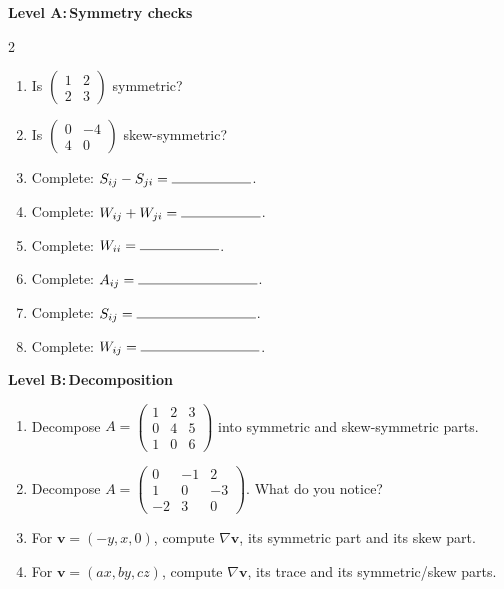\documentclass{otscience}
\begin{document}
\begin{practicebox}
    \textbf{Level A:\,Symmetry checks}
    \begin{multicols}{2}
        \begin{enumerate}
            \item Is \(\begin{pmatrix}1&2\\2&3\end{pmatrix}\) symmetric?
            \item Is \(\begin{pmatrix}0&-4\\4&0\end{pmatrix}\) skew-symmetric?
            \item Complete: \(S_{ij}-S_{ji}=\blank[2cm]\).
            \item Complete: \(W_{ij}+W_{ji}=\blank[2cm]\).
            \item Complete: \(W_{ii}=\blank[2cm]\).
            \item Complete: \(A_{ij}=\blank[3cm]\).
            \item Complete: \(S_{ij}=\blank[3cm]\).
            \item Complete: \(W_{ij}=\blank[3cm]\).
        \end{enumerate}
    \end{multicols}

    \textbf{Level B:\,Decomposition}
    \begin{enumerate}
        \item Decompose \(A=\begin{pmatrix}1&2&3\\0&4&5\\1&0&6\end{pmatrix}\) into symmetric and skew-symmetric parts.
        \item Decompose \(A=\begin{pmatrix}0&-1&2\\1&0&-3\\-2&3&0\end{pmatrix}\). What do you notice?
        \item For \(\mathbf{v}=(-y,x,0)\), compute \(\nabla\mathbf{v}\), its symmetric part and its skew part.
        \item For \(\mathbf{v}=(ax,by,cz)\), compute \(\nabla\mathbf{v}\), its trace and its symmetric/skew parts.
    \end{enumerate}


\end{practicebox}
\end{document}
